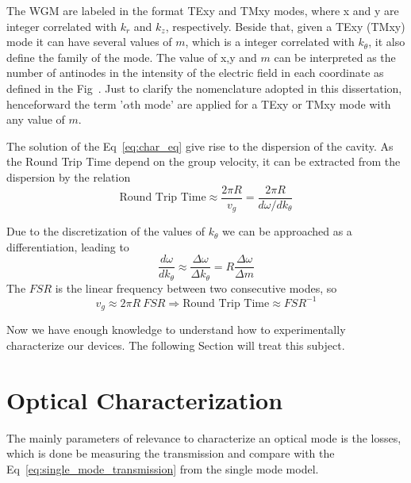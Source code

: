 The WGM are labeled in the format TExy and TMxy modes, where x and y are integer correlated with $k_r$ and $k_z$, respectively. Beside that, given a TExy (TMxy) mode it can have several values of $m$, which is a integer correlated with $k_\theta$, it also define the family of the mode. The value of x,y and $m$ can be interpreted as the number of antinodes in the intensity of the electric field in each coordinate as defined in the Fig~. Just to clarify the nomenclature adopted in this dissertation, henceforward the term '$\alpha$th mode' are applied for a TExy or TMxy mode with any value of $m$. 

The solution of the Eq~\ref{eq:char_eq} give rise to the dispersion of the cavity. As the Round Trip Time depend on the group velocity, it can be extracted from the dispersion by the relation
\begin{equation}
    \text{Round Trip Time} \approx \frac{2\pi R}{v_g} = \frac{2\pi R}{d\omega/dk_\theta} 
\end{equation}

Due to the discretization of the values of $k_\theta$ we can be approached as a differentiation, leading to
\begin{equation}
    \frac{d\omega}{dk_\theta} \approx \frac{\Delta \omega}{\Delta k_\theta} = R\frac{\Delta \omega}{\Delta m}
\end{equation}
The $FSR$ is the linear frequency between two consecutive modes, so
\begin{equation}
    v_g \approx 2\pi R~FSR \Rightarrow \text{Round Trip Time} \approx FSR^{-1} 
\end{equation}

Now we have enough knowledge to understand how to experimentally characterize our devices. The following Section will treat this subject. 

\section{Optical Characterization}

The mainly parameters of relevance to characterize an optical mode is the losses, which is done be measuring the transmission and compare with the Eq~\ref{eq:single_mode_transmission} from the single mode model. 

